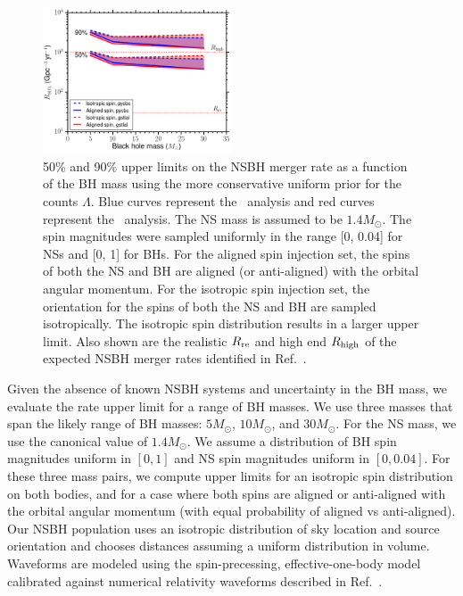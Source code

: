 \begin{figure}[t]
\centering
\includegraphics[width=0.5\textwidth]{figure5.png}
\caption{\label{fig:nsbh_ul_vs_mass} 50\% and 90\% upper limits on the \ac{NSBH} merger rate
as a function of the \ac{BH} mass using the more conservative uniform prior for the counts $\Lambda$. 
Blue curves represent the \pycbc\ analysis and red curves
represent the \gstlal\ analysis. The \ac{NS} mass is assumed to be $1.4M_\odot$. The spin magnitudes
were sampled uniformly in the range [0, 0.04] for \acp{NS} and [0, 1] for \acp{BH}. For the aligned
spin injection set, the spins of both the \ac{NS} and \ac{BH} are aligned (or anti-aligned) with the
orbital angular momentum. For the isotropic spin injection set, the orientation for the
spins of both the \ac{NS} and \ac{BH} are sampled isotropically. The isotropic spin distribution results
in a larger upper limit. Also shown are the realistic $R_{\rm re}$ and high end
$R_{\rm high}$ of the expected \ac{NSBH} merger rates identified in Ref.~\citep{Abadie:2010cf}.}
\end{figure}

Given the absence of known \ac{NSBH} systems and uncertainty in the \ac{BH} mass, we evaluate the
rate upper limit for a range of \ac{BH} masses. We use three masses that span the likely
range of \ac{BH} masses: $5M_\odot$, $10M_\odot$, and $30M_\odot$. For the \ac{NS} mass,
we use the canonical value of $1.4M_\odot$. We assume a distribution of \ac{BH} spin magnitudes
uniform in $[0,1]$ and \ac{NS} spin magnitudes uniform in $[0, 0.04]$.
For these three mass pairs, we compute upper limits for an isotropic spin distribution
on both bodies, and for a case where both spins are aligned or anti-aligned with the orbital angular momentum
(with equal probability of aligned vs anti-aligned).
Our NSBH population uses an isotropic distribution of sky location and source orientation and chooses
distances assuming a uniform distribution in volume. Waveforms are modeled
using the spin-precessing, effective-one-body model calibrated against numerical relativity
waveforms described in Ref.~\citep{Taracchini:2013rva,Babak:2016tgq}.

